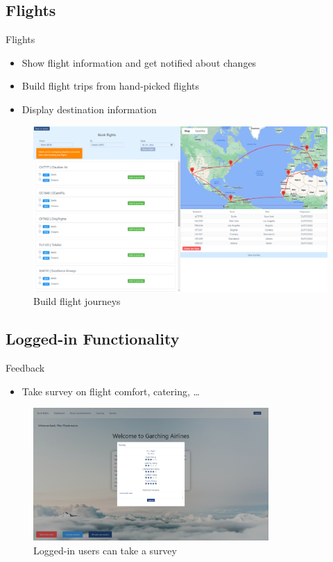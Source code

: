 \documentclass{beamer}
\begin{document}
\subsection{Flights}
\begin{frame}{Flights}
	\begin{itemize}
		\item Show flight information and get notified about changes
		\item Build flight trips from hand-picked flights
		\item Display destination information
	\end{itemize}
	\begin{figure}
		\includegraphics[width=.8\textwidth]{../images/BookFlights.png}
		\caption{Build flight journeys}
	\end{figure}
\end{frame}
%
\subsection{Logged-in Functionality}
\begin{frame}{Feedback}
	\begin{itemize}
		\item Take survey on flight comfort, catering, \dots
	\end{itemize}
	\begin{figure}
		\includegraphics[width=0.8\textwidth]{../images/survey.png}
		\caption{Logged-in users can take a survey}
	\end{figure}
\end{frame}
%
\end{document}
